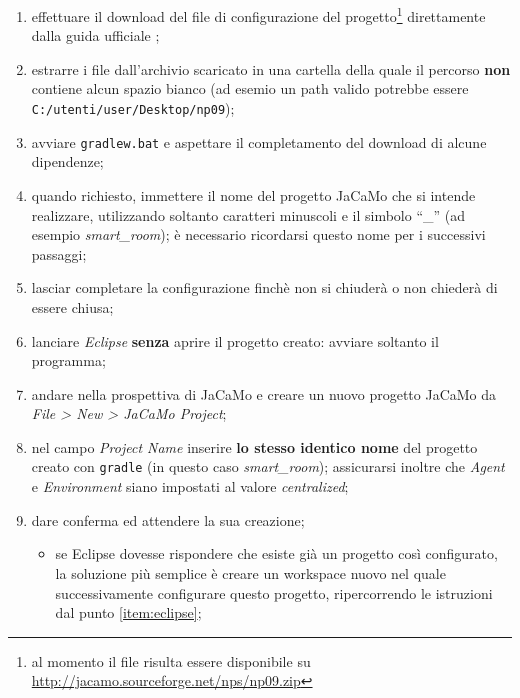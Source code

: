 \documentclass[12pt,a4paper,openright,oneside]{report}
\newcommand{\quotes}[1]{``#1''}
\begin{document}
\begin{enumerate}
	\item effettuare il download del file di configurazione del progetto\footnote{al momento il file risulta essere disponibile su \url{http://jacamo.sourceforge.net/nps/np09.zip}} direttamente dalla guida ufficiale \cite{jacamo};
	
	\item estrarre i file dall'archivio scaricato in una cartella della quale il percorso \textbf{non} contiene alcun spazio bianco (ad esemio un path valido potrebbe essere \texttt{C:/utenti/user/Desktop/np09});
	
	\item avviare \texttt{gradlew.bat} e aspettare il completamento del download di alcune dipendenze;
	
	\item quando richiesto, immettere il nome del progetto JaCaMo che si intende realizzare, utilizzando soltanto caratteri minuscoli e il simbolo \quotes{\_} (ad esempio \textit{smart\_room}); è necessario ricordarsi questo nome per i successivi passaggi;
	
	\item lasciar completare la configurazione finchè non si chiuderà o non chiederà di essere chiusa;
	
	\item \label{item:eclipse}lanciare \textit{Eclipse} \textbf{senza} aprire il progetto creato: avviare soltanto il programma;
	
	\item andare nella prospettiva di JaCaMo e creare un nuovo progetto JaCaMo da \textit{File > New > JaCaMo Project};
	
	\item nel campo \textit{Project Name} inserire \textbf{lo stesso identico nome} del progetto creato con \texttt{gradle} (in questo caso \textit{smart\_room}); assicurarsi inoltre che \textit{Agent} e \textit{Environment} siano impostati al valore \textit{centralized};
	
	\item dare conferma ed attendere la sua creazione;
	\begin{itemize}
		\item se Eclipse dovesse rispondere che esiste già un progetto così configurato, la soluzione più semplice è creare un workspace nuovo nel quale successivamente configurare questo progetto, ripercorrendo le istruzioni dal punto \ref{item:eclipse};
	\end{itemize}
	

\end{enumerate}
\end{document}
